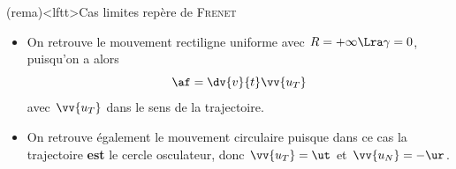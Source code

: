 \documentclass[../../main/main.tex]{subfiles}
\begin{document}
\begin{tcb*}
\begin{isd}[interior hidden, righthand ratio=.3]
      \tcblower
      \begin{center}
        \vspace{-15pt}
      \end{center}
    \end{isd}
\end{tcb*}

\begin{tcb*}(rema)<lftt>{Cas limites repère de \textsc{Frenet}}
	\begin{itemize}
		\item On retrouve le mouvement rectiligne uniforme avec $R = +\infty \Lra
			      \gamma = 0$, puisqu'on a alors
		      \[\af = \dv{v}{t}\vv{u_T}\]
		      avec $\vv{u_T}$ dans le sens de la trajectoire.

		\item On retrouve également le mouvement circulaire puisque dans ce cas la
		      trajectoire \textbf{est} le cercle osculateur, donc $\vv{u_T} = \ut$ et
		      $\vv{u_N} = -\ur$.
	\end{itemize}
\end{tcb*}
\end{document}
